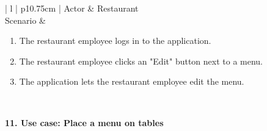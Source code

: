 \begin{center}
  \begin{tabular}{| l | p{10.75cm} | }
    \hline
    Actor        & Restaurant \\
    \hline
    Scenario     &
    \begin{minipage}[t]{\linewidth}
      \begin{enumerate}[leftmargin=*,nosep,before=\vspace{-0.575\baselineskip},after=\strut]
        \item The restaurant employee logs in to the application.
        \item The restaurant employee clicks an "Edit" button next to a menu.
        \item The application lets the restaurant employee edit the menu.
      \end{enumerate}
    \end{minipage}
    \\
    \hline
  \end{tabular}
  \newline
\end{center}

\noindent \textbf{11. Use case: Place a menu on tables}

